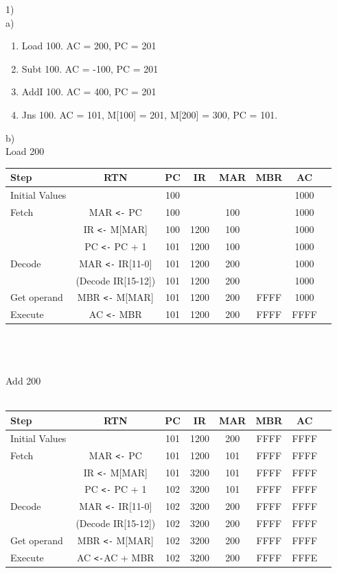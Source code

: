 \documentclass{article}
\begin{document}
	1)\\
	a)
	\begin{enumerate}[i]
		\item Load 100. AC = 200, PC = 201 
		\item Subt 100. AC = -100, PC = 201
		\item AddI 100. AC = 400, PC = 201
		\item Jns 100. AC = 101,  M[100] = 201, M[200] = 300, PC = 101.
	\end{enumerate}
	b)
\\
Load 200\\
\begin{tabular}{l*{6}{c}r}
Step              & RTN & PC & IR & MAR & MBR  & AC \\
\hline
Initial Values    &     & 100 &  &  &  &  1000\\
Fetch            & MAR \verb|<-| PC & 100 &  & 100 &   &  1000\\
                 & IR \verb|<-| M[MAR] & 100 & 1200 & 100 &   & 1000 \\
                & PC \verb|<-| PC + 1 & 101 & 1200 & 100 &   &  1000\\
Decode     &  MAR \verb|<-| IR[11-0] & 101 & 1200 & 200 &   &  1000\\
     &  (Decode IR[15-12]) & 101 & 1200 & 200 &   &  1000\\
Get operand &    MBR \verb|<-| M[MAR] & 101 & 1200 & 200 &  FFFF & 1000 \\
Execute &    AC \verb|<-| MBR & 101 & 1200 & 200 &  FFFF &  FFFF\\
\end{tabular}
\\
\\
\\
Add 200
\\
\\
\begin{tabular}{l*{6}{c}r}
Step              & RTN & PC & IR & MAR & MBR  & AC \\
\hline
Initial Values    &     &  101 & 1200 & 200 &  FFFF &  FFFF\\
Fetch            & MAR \verb|<-| PC &  101 & 1200 & 101 &  FFFF &  FFFF\\
                 & IR \verb|<-| M[MAR] &  101 & 3200 & 101 &  FFFF &  FFFF\\
                & PC \verb|<-| PC + 1 & 102 & 3200 & 101 &  FFFF &  FFFF\\
Decode     &  MAR \verb|<-| IR[11-0] & 102 & 3200 & 200 &  FFFF &  FFFF\\
     &  (Decode IR[15-12]) &  102 & 3200 & 200 &  FFFF &  FFFF\\
Get operand &    MBR \verb|<-| M[MAR] & 102 & 3200 & 200 &  FFFF &  FFFF\\
Execute &    AC \verb|<-|AC + MBR & 102 & 3200 & 200 &  FFFF &  FFFE\\
\end{tabular}
\end{document}

